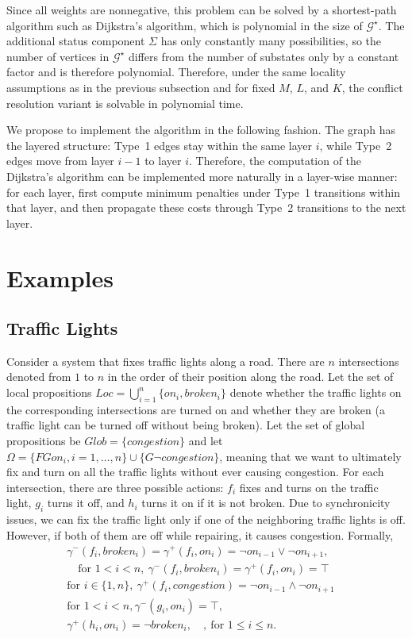 \documentclass[a4paper,fleqn]{cas-dc}
\begin{document}
Since all weights are nonnegative, this problem can be solved by a shortest-path
algorithm such as Dijkstra's algorithm, which is polynomial in the size of $\mathcal{G}^{\star}$. 
The additional status component $\Sigma$ has only constantly many possibilities, so the number of vertices in $\mathcal{G}^{\star}$ differs from the number of substates only by a constant factor and is therefore polynomial.
Therefore, under the same locality assumptions as in the previous subsection and for fixed $M$, $L$, and
$K$, the conflict resolution variant is solvable in polynomial time.

We propose to implement the algorithm in the following fashion.
The graph has the layered structure: Type~1 edges stay within the same layer $i$, while Type~2 edges move
from layer $i-1$ to layer $i$. Therefore, the computation of the Dijkstra's algorithm can be implemented more
naturally in a layer-wise manner: for each layer, first compute minimum penalties under
Type~1 transitions within that layer, and then propagate these costs through Type~2 transitions
to the next layer.

\section{Examples}\label{example}

\subsection{Traffic Lights}\label{ex1}

Consider a system that fixes traffic lights along a road. There are $n$ intersections denoted from $1$ to $n$ in the order of their position along the road. Let the set of local propositions
$Loc=\bigcup_{i=1}^n\{on_i, broken_i\}$ denote whether the traffic lights on the corresponding
intersections are turned on and whether they are broken (a traffic light can be turned off without being broken). Let the set of global propositions be $Glob=\{congestion\}$ and let $\Omega=\{FGon_i, i=1,\dots,n\}\cup\{G\neg congestion\}$, meaning that we want to ultimately
fix and turn on all the traffic lights without ever causing congestion. For each intersection, there are three possible actions: $f_i$ fixes and turns on the traffic light, $g_i$ turns it off, and $h_i$ turns it on if it is not broken. Due to synchronicity issues, we can fix the traffic light only if one of the neighboring traffic lights is off. However, if both of them are off while repairing, it causes congestion. Formally,
\begin{multline}\gamma^-(f_i, broken_i)=\gamma^+(f_i, on_i)=\neg on_{i-1}\lor \neg on_{i+1}, \\ \quad \textrm{for } 1<i<n,\  
\gamma^-(f_i, broken_i)=\gamma^+(f_i, on_i)=\top \quad \\ \textrm{for } i\in\{1,n\},\ 
\gamma^+(f_i, congestion)=\neg on_{i-1}\land \neg on_{i+1}\quad \\ \textrm{for } 1<i<n,
\gamma^-(g_i, on_i)=\top,\\ \gamma^+(h_i, on_i)=\neg broken_i,\quad,\ \textrm{for } 1\le i\le n.
\end{multline}
\end{document}
